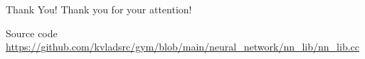 \documentclass[aspectratio=169]{beamer}
\begin{document}
\begin{frame}{Thank You!}
  \centering
  \vfill
  {\Huge Thank you for your attention!}

  \vspace{2em}
  \begin{block}{Source code}
    \centering
    {\scriptsize
      \url{https://github.com/kvladsrc/gym/blob/main/neural_network/nn_lib/nn_lib.cc}
    }
  \end{block}
  \vfill
\end{frame}
\end{document}
